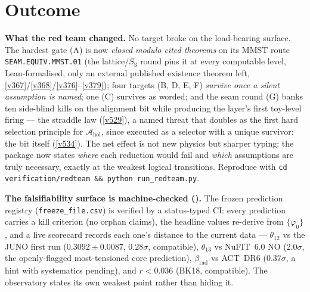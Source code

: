 \section*{Outcome}
\par\smallskip\noindent\textbf{What the red team changed.}
No target broke on the load-bearing surface. The hardest gate (A) is now \emph{closed modulo cited theorems} on its MMST route \texttt{SEAM.EQUIV.MMST.01} (the lattice/$S_3$ round pins it
at every computable level, Lean-formalised, only an external published existence theorem left,
\vref{v367}/\vref{v368}/\vref{v376}--\vref{v379});
four targets (B, D, E, F) \emph{survive once a silent assumption is named}; one (C) survives as
worded; and the seam round (G) banks ten side-blind kills on the alignment bit while producing
the layer's first toy-level firing --- the straddle law (\vref{v529}), a named threat that doubles
as the first hard selection principle for $\mathcal A_{\mathrm{hol}}$, since executed as a selector
with a unique survivor: the bit itself (\vref{v534}). The net effect is not new
physics but sharper typing: the package now states \emph{where}
each reduction would fail and \emph{which} assumptions are truly necessary, exactly at the weakest
logical transitions. Reproduce with \texttt{cd verification/redteam \&\& python run\_redteam.py}.

\par\smallskip\noindent\textbf{The falsifiability surface is machine-checked ().}
The frozen prediction registry (\texttt{freeze\_file.csv}) is verified by a status-typed CI: every prediction
carries a kill criterion (no orphan claims), the headline values re-derive from $\{\varphi_0\}$, and a live scorecard
records each one's distance to the current data --- $\theta_{12}$ vs the JUNO first run ($0.3092{\pm}0.0087$,
$0.28\sigma$, compatible), $\theta_{13}$ vs NuFIT~6.0 NO ($2.0\sigma$, the openly-flagged most-tensioned core
prediction), $\beta_{\mathrm{rad}}$ vs ACT~DR6 ($0.37\sigma$, a hint with systematics pending), and $r<0.036$
(BK18, compatible). The observatory states its own weakest point rather than hiding it.

